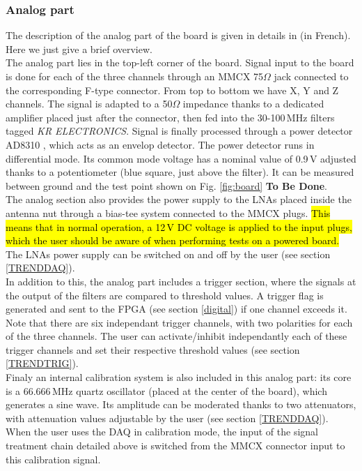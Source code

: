 \subsubsection{Analog part}
\label{analog}
The description of the analog part of the board is given in details in \cite{GP35ana} (in French). Here we just give a brief overview. \\
%
The analog part lies in the top-left corner of the board. Signal input to the board is done for each of the three channels through an MMCX 75$\Omega$ jack connected to the corresponding F-type connector. From top to bottom we have X, Y and Z channels. The signal is adapted to a 50$\Omega$ impedance thanks to a dedicated amplifier placed just after the connector, then fed into the 30-100\,MHz filters tagged {\it KR ELECTRONICS}. Signal is finally processed through a power detector AD8310 \cite{AD8310}, which acts as an envelop detector. The power detector runs in differential mode. Its common mode voltage has a nominal value of 0.9\,V adjusted thanks to a potentiometer (blue square, just above the filter). It can be measured between ground and the test point shown on Fig. \ref{fig:board} {\bf To Be Done}. \\
%
The analog section also provides the power supply to the LNAs placed inside the antenna nut through a bias-tee system connected to the MMCX plugs. \hl{This means that in normal operation, a 12\,V DC voltage is applied to the input plugs, which the user should be aware of when performing tests on a powered board.} The LNAs power supply can be switched on and off by the user (see section \ref{TRENDDAQ}).  \\
%
In addition to this, the analog part includes a trigger section, where the signals at the output of the filters are compared to threshold values. A trigger flag is generated and sent to the FPGA (see section \ref{digital}) if one channel exceeds it. Note that there are six independant trigger channels, with two polarities for each of the three channels. The user can activate/inhibit independantly each of these trigger channels and set their respective threshold values (see section \ref{TRENDTRIG}). \\
%
Finaly an internal calibration system is also included in this analog part: its core is a 66.666\,MHz quartz oscillator (placed at the center of the board), which generates a sine wave. Its amplitude can be moderated thanks to two attenuators, with attenuation values adjustable by the user (see section \ref{TRENDDAQ}). When the user uses the DAQ in calibration mode, the input of the signal treatment chain detailed above is switched from the MMCX connector input to this calibration signal.
   

